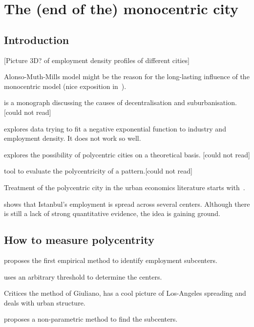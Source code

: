 %
\chapter{The (end of the) monocentric city}
\label{sec:related}


\section{Introduction}
\label{sec:introduction}

[Picture 3D? of employment density profiles of different cities]

Alonso-Muth-Mills model might be the reason for the long-lasting influence of
the monocentric model (nice exposition in~\cite{Fujita:1989}).

\cite{Mills:1972} is a monograph discussing the causes of decentralisation and
suburbanisation. [could not read]

\cite{Kemper:1974} explores data trying to fit a negative exponential function
to industry and employment density. It does not work so well.

\cite{Odland:1978} explores the possibility of polycentric cities on a
theoretical basis. [could not read]

\cite{Griffith:1981} tool to evaluate the polycentricity of a pattern.[could not
read]

Treatment of the polycentric city in the urban economics literature starts
with~\cite{Fujita:1982}.

\cite{Dokmeci:1994} shows that Istanbul's employment is spread across several
centers. Although there is still a lack of strong quantitative evidence, the
idea is gaining ground.



\section{How to measure polycentrity}
\label{sec:how_to_measure_polycentrity}

\cite{McDonald:1987} proposes the first empirical method to identify employment
subcenters.

\cite{Giuliano:1991} uses an arbitrary threshold to determine the centers.

\cite{Anas:1998} Critices the method of Giuliano, has a cool picture of
Los-Angeles spreading and deals with urban structure.

\cite{McMillen:2001} proposes a non-parametric method to find the subcenters.

